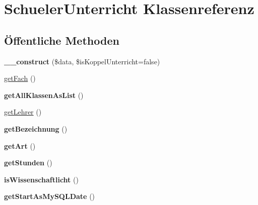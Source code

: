 \hypertarget{class_schueler_unterricht}{}\section{Schueler\+Unterricht Klassenreferenz}
\label{class_schueler_unterricht}
\subsection*{Öffentliche Methoden}
\begin{DoxyCompactItemize}
\item 
\mbox{\label{class_schueler_unterricht_ae49b177f6b422503efdacf06af3d76a4}} 
{\bfseries \+\_\+\+\_\+construct} (\$data, \$is\+Koppel\+Unterricht=false)
\item 
\mbox{\hyperlink{class_schueler_unterricht_a7d339729cff574e8b6bd8fa0b620ca09}{get\+Fach}} ()
\item 
\mbox{\label{class_schueler_unterricht_aedc8b135cc79a57a2827b6d79d0ce909}} 
{\bfseries get\+All\+Klassen\+As\+List} ()
\item 
\mbox{\hyperlink{class_schueler_unterricht_ad1076fb3dcd92496168563af63642cbd}{get\+Lehrer}} ()
\item 
\mbox{\label{class_schueler_unterricht_a38f5337405d763850e0b76724da9cc6a}} 
{\bfseries get\+Bezeichnung} ()
\item 
\mbox{\label{class_schueler_unterricht_aee323943ef0d08adefb510d626dadec1}} 
{\bfseries get\+Art} ()
\item 
\mbox{\label{class_schueler_unterricht_a523d74be87b474ae54c38994884741b7}} 
{\bfseries get\+Stunden} ()
\item 
\mbox{\label{class_schueler_unterricht_a7d986cd9dc97af6919098daf86182415}} 
{\bfseries is\+Wissenschaftlicht} ()
\item 
\mbox{\label{class_schueler_unterricht_a408d324034495564856ce7732b98cab0}} 
{\bfseries get\+Start\+As\+My\+S\+Q\+L\+Date} ()
\item 
\mbox{\label{class_schueler_unterricht_ac9f3cb9151ac9f170ab9c9a75ea8805f}} 

\end{DoxyCompactItemize}
